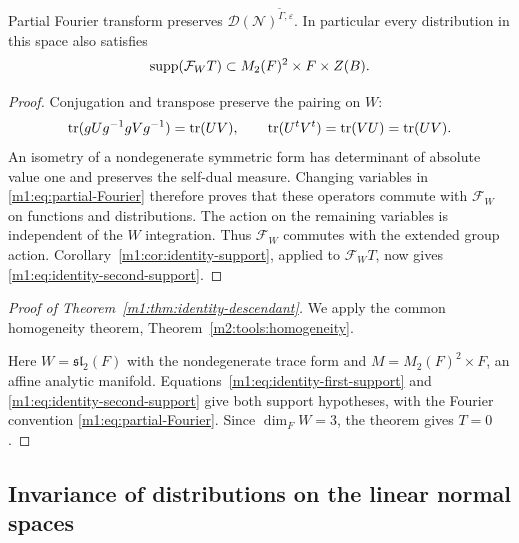 \begin{lemma}\label{m1:lem:identity-Fourier}
Partial Fourier transform preserves
$\mathcal D(\mathcal N)^{\widetilde\Gamma,\varepsilon}$. In particular
every distribution in this space also satisfies
\begin{equation}\label{m1:eq:identity-second-support}
 \operatorname{supp}(\mathcal F_WT)\subset M_2(F)^2\times F\times Z(B).
\end{equation}
\end{lemma}
\begin{proof}
Conjugation and transpose preserve the pairing on $W$:
\[
 \operatorname{tr}(gUg^{-1}gVg^{-1})=\operatorname{tr}(UV),\qquad
 \operatorname{tr}(U^tV^t)=\operatorname{tr}(VU)=\operatorname{tr}(UV).
\]
An isometry of a nondegenerate symmetric form has determinant of
absolute value one and preserves the self-dual measure. Changing
variables in \eqref{m1:eq:partial-Fourier} therefore proves that these
operators commute with $\mathcal F_W$ on functions and distributions.
The action on the remaining variables is independent of the $W$
integration. Thus $\mathcal F_W$ commutes with the extended group action.
Corollary~\ref{m1:cor:identity-support}, applied to $\mathcal F_WT$, now gives
\eqref{m1:eq:identity-second-support}.
\end{proof}
\begin{proof}[Proof of Theorem~\ref{m1:thm:identity-descendant}]
We apply the common homogeneity theorem, Theorem~\ref{m2:tools:homogeneity}.

Here $W=\mathfrak{sl}_2(F)$ with the nondegenerate trace form and
$M=M_2(F)^2\times F$, an affine analytic manifold. Equations~\eqref{m1:eq:identity-first-support} and
\eqref{m1:eq:identity-second-support} give both support hypotheses, with
the Fourier convention \eqref{m1:eq:partial-Fourier}. Since $\dim_F W=3$,
the theorem gives $T=0$.
\end{proof}

\subsection{Invariance of distributions on the linear normal spaces}\label{m1:sec:descendants}
\label{m1:subsec:dense-descendants}\label{m1:subsec:rankzero-descendants}
\label{m1:subsec:rankone-descendants}\label{m1:subsec:exhaustive-descendants}

